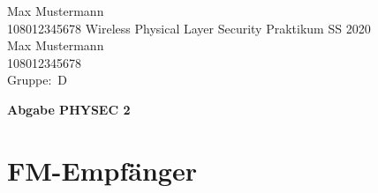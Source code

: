 \documentclass[12pt,a4paper]{article}
\newcommand{\student}{Max Mustermann\\ 108012345678 } %
\newcommand{\partner}{Max Mustermann\\ 108012345678} %
\newcommand{\thirdone}{Max Mustermann\\ 108012345678}
\newcommand{\group}{D} %
\newcommand{\hwheadtwo}{$ $
  \vspace{-2cm}
  
\noindent \student \qquad \qquad  Wireless Physical Layer Security Praktikum \hfill SS 2020 \\
\noindent \partner \\
\noindent Gruppe:~\group\\
$ $

  
\begin{center}    
{\Large \bf Abgabe PHYSEC 2}
\end{center}
}
\begin{document}
\hwheadtwo

\section{FM-Empfänger}

\begin{comment}  


\subsection*{a)}


Zuerst muss inspectrum installiert werden. Als nächstes wird inspectrum gestartet und die mitgegebene file namens SecretSignal.raw geöffnet. %
%
Anschließend wird das Programm mit der rechten Maus-Taste angeklickt: Add derived plot -> Add sample plot.
%
Eine horizontale \glqq Spannweite\grqq \hspace{0.5mm} öffnet sich. Es muss entsprechend mit der Maus angepasst werden. %
% 
Es ist bekannt, dass  Amplitude-Shift Keying, abgekürzt ASK als digitale Modulationsart verwendet wurde. Entsprechend werden Nullen und Einsen zugewiesen, siehe Abbildung~\ref{fig:YourLabe3}.
%
Darüber hinaus ist bekannt, dass die Nachricht mit der Präambel 0x55 anfängt, welche nicht teil der eigentlichen Nachricht ist. %
%
Danach wird in Bytes aufgeteilt und mit ASCII kodiert.


\subsection*{b)}

Die Nachricht besteht aus dem wiederholten String \glqq Money4Physec\grqq. Abfolge: 
0x55, 0x4D, 0x6F, 0x6E, 0x65, 0x79, 0x34, 0x50, 0x68, 0x79, 0x73, 0x65, 0x63, 0x55, 0x4D und so weiter... \\


\begin{figure}[ht!]
\centering
	\texttt{[image: images\_files/ascii-table.png]}
	\caption{\href{https://www.sciencebuddies.org/science-fair-projects/references/ascii-table}{Quelle: Hier klicken}}
	\label{fig:YourLabel}
	
\end{figure}


\newpage


\begin{center}
Diese Tabelle weist jedem Byte die entsprechende ASCII Kodierung zu:


\end{comment}
\end{document}
